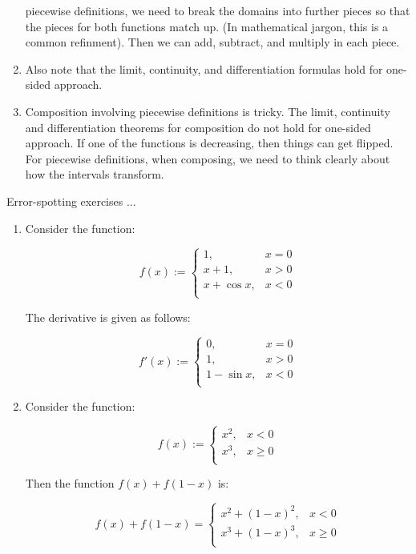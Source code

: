 \documentclass[10pt]{amsart}
\begin{document}
\begin{enumerate}
  piecewise definitions, we need to break the domains into further
  pieces so that the pieces for both functions match up. (In
  mathematical jargon, this is a common refinment). Then we can add,
  subtract, and multiply in each piece.
\item Also note that the limit, continuity, and differentiation
  formulas hold for one-sided approach.
\item Composition involving piecewise definitions is tricky. The
  limit, continuity and differentiation theorems for composition do
  not hold for one-sided approach. If one of the functions is
  decreasing, then things can get flipped. For piecewise definitions,
  when composing, we need to think clearly about how the intervals
  transform.
\end{enumerate}

Error-spotting exercises ...

\begin{enumerate}
\item Consider the function:

  $$f(x) := \left\lbrace \begin{array}{rl} 1, & x = 0 \\ x + 1, & x > 0 \\ x + \cos x, & x < 0 \\\end{array}\right.$$

  The derivative is given as follows:

  $$f'(x) := \left\lbrace \begin{array}{rl} 0, & x = 0 \\ 1, & x > 0 \\ 1 - \sin x, & x < 0 \\\end{array}\right.$$
\item Consider the function:

  $$f(x) := \left\lbrace \begin{array}{rl} x^2, & x < 0 \\ x^3, & x \ge 0 \\\end{array}\right.$$

  Then the function $f(x) + f(1 - x)$ is:

  $$f(x) + f(1 - x) = \left\lbrace \begin{array}{rl} x^2 + (1 - x)^2, & x < 0 \\ x^3 + (1 - x)^3, & x \ge 0 \\\end{array}\right.$$
\end{enumerate}
\end{document}
